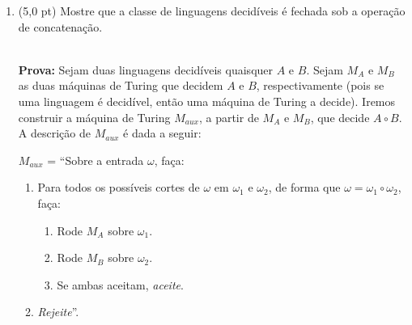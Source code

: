 \documentclass[12pt,a4paper,oneside]{article}
\begin{document}
\begin{enumerate}
\begin{enumerate}
		\item $10\#11$ \ \ {\color{blue} {\bf R:} 
			A sequência de configurações é \\
			$q_1 10 \# 11$, \\
			$x q_3 0 \# 11$, \\
			$x 0 q_3 \# 11$, \\
			$x 0 \# q_5 11$, \\
			$x 0 q_6 \#  x1$, \\
			$x q_7 0 \#  x1$, \\
			$q_7 x 0 \#  x1$, \\
			$x q_1 0 \#  x1$, \\
			$x x q_2 \#  x1$, \\
			$x x \#  q_4 x1$, \\
			$x x \#  x q_41$, \ \ e \\
			$x x \#  x x q_{reject} \sqcup$. \\
			(admite-se aqui que todas as transições ocultas para o $q_{reject}$ escrevem o símbolo $x$ na fita e move a cabeça para a direita).
		}
	\end{enumerate}

	\newpage

	 
	\item (5,0 pt) Mostre que a classe de linguagens decidíveis é fechada sob a operação de concatenação. \\
	\\{\color{blue}	
		{\bf Prova:} Sejam duas linguagens decidíveis quaisquer $A$ e $B$. Sejam $M_A$ e $M_B$ as duas máquinas de Turing que decidem $A$ e $B$, respectivamente (pois se uma linguagem é decidível, então uma máquina de Turing a decide). Iremos construir a máquina de Turing $M_{aux}$, a partir de $M_A$ e $M_B$, que decide $A \circ B$. A descrição de $M_{aux}$ é dada a seguir:
		
		$M_{aux}$ = ``Sobre a entrada $\omega$, faça:
		\begin{enumerate}
			\item Para todos os possíveis cortes de $\omega$ em $\omega_1$ e $\omega_2$, de forma que $\omega = \omega_1 \circ \omega_2$, faça:
			\begin{enumerate}
				\item Rode $M_A$ sobre $\omega_1$. 
				\item Rode $M_B$ sobre $\omega_2$. 
				\item Se ambas aceitam, {\it aceite}.
			\end{enumerate}
			\item {\it Rejeite}''.
		\end{enumerate}
		
}
\end{enumerate}
\end{document}
